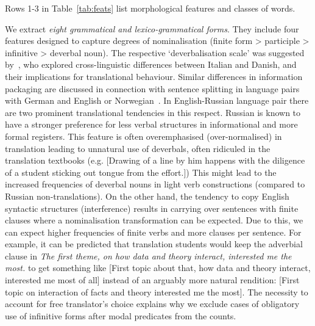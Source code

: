 Rows 1-3 in Table~\ref{tab:feats} list morphological features and classes of words.

We extract \textit{eight grammatical and lexico-grammatical forms}. They include four features designed to capture degrees of nominalisation (finite form > participle > infinitive > deverbal noun). The respective `deverbalisation scale' was suggested by~\cite{Korzen2011}, who explored cross-linguistic differences between Italian and Danish, and their implications for translational behaviour. Similar differences in information packaging are discussed in connection with sentence splitting in language pairs with German and English or Norwegian~\cite{FabriciusHansen1999}. 
In English-Russian language pair there are two prominent translational tendencies in this respect. Russian is known to have a stronger preference for less verbal structures in informational and more formal registers. This feature is often overemphasised (over-normalised) in translation leading to unnatural use of deverbals, often ridiculed in the translation textbooks (e.g.  [Drawing of a line by him happens with the diligence of a student sticking out tongue from the effort.]) This might lead to the increased frequencies of deverbal nouns in light verb constructions (compared to Russian non-translations). On the other hand, the tendency to copy English syntactic structures (interference) results in carrying over sentences with finite clauses where a nominalisation transformation can be expected. Due to this, we can expect higher frequencies of finite verbs and more clauses per sentence. For example, it can be predicted that translation students would keep the adverbial clause in \textit{The first theme, on how data and theory interact, interested me the most.} to get something like  [First topic about that, how data and theory interact, interested me most of all] instead of an arguably more natural rendition:  [First topic on interaction of facts and theory interested me the most].   
The necessity to account for free translator's choice explains why we exclude cases of obligatory use of infinitive forms after modal predicates from the counts.

